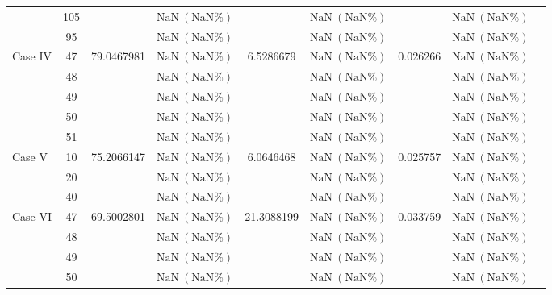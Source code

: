 \begin{table}[htbp]
{\begin{tabular}{lclcccccc}
    & 105 & & $\mathrm{NaN}\ (\mathrm{NaN}\%)$ & & $\mathrm{NaN}\ (\mathrm{NaN}\%)$ & & $\mathrm{NaN}\ (\mathrm{NaN}\%)$ \\
    & 95 & & $\mathrm{NaN}\ (\mathrm{NaN}\%)$ & & $\mathrm{NaN}\ (\mathrm{NaN}\%)$ & & $\mathrm{NaN}\ (\mathrm{NaN}\%)$ \\
    \midrule
    \multirow{5}{*}{Case IV} & 47 & \multirow{5}{*}{79.0467981} & $\mathrm{NaN}\ (\mathrm{NaN}\%)$ & \multirow{5}{*}{6.5286679} & $\mathrm{NaN}\ (\mathrm{NaN}\%)$ & \multirow{5}{*}{0.026266} & $\mathrm{NaN}\ (\mathrm{NaN}\%)$ \\
    & 48 & & $\mathrm{NaN}\ (\mathrm{NaN}\%)$ & & $\mathrm{NaN}\ (\mathrm{NaN}\%)$ & & $\mathrm{NaN}\ (\mathrm{NaN}\%)$ \\
    & 49 & & $\mathrm{NaN}\ (\mathrm{NaN}\%)$ & & $\mathrm{NaN}\ (\mathrm{NaN}\%)$ & & $\mathrm{NaN}\ (\mathrm{NaN}\%)$ \\
    & 50 & & $\mathrm{NaN}\ (\mathrm{NaN}\%)$ & & $\mathrm{NaN}\ (\mathrm{NaN}\%)$ & & $\mathrm{NaN}\ (\mathrm{NaN}\%)$ \\
    & 51 & & $\mathrm{NaN}\ (\mathrm{NaN}\%)$ & & $\mathrm{NaN}\ (\mathrm{NaN}\%)$ & & $\mathrm{NaN}\ (\mathrm{NaN}\%)$ \\
    \midrule
    \multirow{3}{*}{Case V} & 10 & \multirow{3}{*}{75.2066147} & $\mathrm{NaN}\ (\mathrm{NaN}\%)$ & \multirow{3}{*}{6.0646468} & $\mathrm{NaN}\ (\mathrm{NaN}\%)$ & \multirow{3}{*}{0.025757} & $\mathrm{NaN}\ (\mathrm{NaN}\%)$ \\
    & 20 & & $\mathrm{NaN}\ (\mathrm{NaN}\%)$ & & $\mathrm{NaN}\ (\mathrm{NaN}\%)$ & & $\mathrm{NaN}\ (\mathrm{NaN}\%)$ \\
    & 40 & & $\mathrm{NaN}\ (\mathrm{NaN}\%)$ & & $\mathrm{NaN}\ (\mathrm{NaN}\%)$ & & $\mathrm{NaN}\ (\mathrm{NaN}\%)$ \\
    \midrule
    \multirow{5}{*}{Case VI} & 47 & \multirow{5}{*}{69.5002801} & $\mathrm{NaN}\ (\mathrm{NaN}\%)$ & \multirow{5}{*}{21.3088199} & $\mathrm{NaN}\ (\mathrm{NaN}\%)$ & \multirow{5}{*}{0.033759} & $\mathrm{NaN}\ (\mathrm{NaN}\%)$ \\
    & 48 & & $\mathrm{NaN}\ (\mathrm{NaN}\%)$ & & $\mathrm{NaN}\ (\mathrm{NaN}\%)$ & & $\mathrm{NaN}\ (\mathrm{NaN}\%)$ \\
    & 49 & & $\mathrm{NaN}\ (\mathrm{NaN}\%)$ & & $\mathrm{NaN}\ (\mathrm{NaN}\%)$ & & $\mathrm{NaN}\ (\mathrm{NaN}\%)$ \\
    & 50 & & $\mathrm{NaN}\ (\mathrm{NaN}\%)$ & & $\mathrm{NaN}\ (\mathrm{NaN}\%)$ & & $\mathrm{NaN}\ (\mathrm{NaN}\%)$ \\

\end{tabular}}
\end{table}
